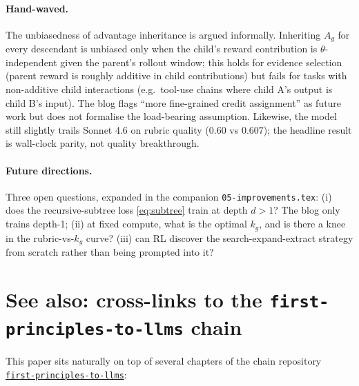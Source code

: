 \documentclass[11pt]{article}
\begin{document}
\paragraph{Hand-waved.}
The unbiasedness of advantage inheritance is argued informally. Inheriting
$A_g$ for every descendant is unbiased only when the child's reward
contribution is $\theta$-independent given the parent's rollout window; this
holds for evidence selection (parent reward is roughly additive in child
contributions) but fails for tasks with non-additive child interactions
(e.g.\ tool-use chains where child A's output is child B's input). The blog
flags ``more fine-grained credit assignment'' as future work but does not
formalise the load-bearing assumption. Likewise, the model still slightly
trails Sonnet 4.6 on rubric quality ($0.60$ vs $0.607$); the headline result
is wall-clock parity, not quality breakthrough.

\paragraph{Future directions.}
Three open questions, expanded in the companion \texttt{05-improvements.tex}:
(i) does the recursive-subtree loss \eqref{eq:subtree} train at depth $d > 1$?
The blog only trains depth-1; (ii) at fixed compute, what is the optimal $k_g$,
and is there a knee in the rubric-vs-$k_g$ curve? (iii) can RL discover the
search-expand-extract strategy from scratch rather than being prompted into it?

\section*{See also: cross-links to the \texttt{first-principles-to-llms} chain}

This paper sits naturally on top of several chapters of the chain repository
\href{https://github.com/pleyva2004/first-principles-to-llms}{\texttt{first-principles-to-llms}}:
\end{document}
